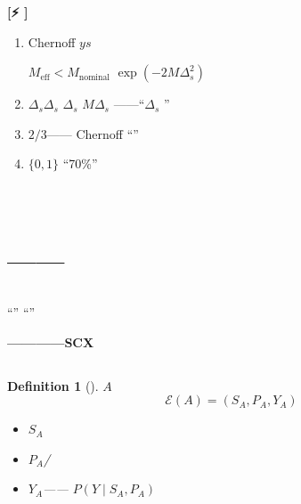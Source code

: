 \documentclass[11pt,a4paper]{article}
\newtheorem{definition}[theorem]{Definition}
\theoremstyle{remark}
\newcommand{\honestwarning}{\textnormal{\textbf{[⚡ ]}}}
\begin{document}
\honestwarning{} \textbf{}

\begin{enumerate}[label=(\arabic*)]
    \item \textbf{}Chernoff\textbf{}
          $y$$s$
          
          $M_{\text{eff}} < M_{\text{nominal}}$
          $\exp(-2M\Delta_s^2)$

    \item \textbf{$\Delta_s$}$\Delta_s$
          $\Delta_s$
          $M$$\Delta_s$
          ——``$\Delta_s$
          ''

    \item \textbf{}
          $2/3$——
          Chernoff
          ``''

    \item \textbf{}$\{0,1\}$
          ``70\%''
          
          
\end{enumerate}

\section{\\
         \large ——}

\subsection{}

``''
\textbf{}``''
\textbf{}


\textbf{————SCX
}

\subsection{}

\begin{definition}[]
\label{def:evidence_profile}
$A$\textbf{}
\begin{equation}
    \mathcal{E}(A) = (S_A, P_A, Y_A)
\end{equation}

\begin{itemize}
    \item $S_A$
    \item $P_A$/
    \item $Y_A$——
          $P(Y \mid S_A, P_A)$
\end{itemize}
\end{definition}
\end{document}
